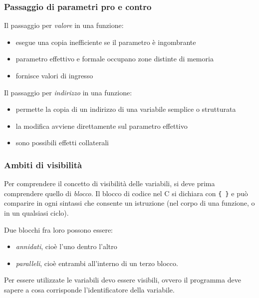 \documentclass[
]{article}
\begin{document}
\hypertarget{header-n855}{%
\subsubsection{Passaggio di parametri pro e contro}\label{header-n855}}

Il passaggio per \emph{valore} in una funzione:

\begin{itemize}
\item
  esegue una copia inefficiente se il parametro è ingombrante
\item
  parametro effettivo e formale occupano zone distinte di memoria
\item
  fornisce valori di ingresso
\end{itemize}

Il passaggio per \emph{indirizzo} in una funzione:

\begin{itemize}
\item
  permette la copia di un indirizzo di una variabile semplice o
  strutturata
\item
  la modifica avviene direttamente sul parametro effettivo
\item
  sono possibili effetti collaterali
\end{itemize}

\hypertarget{header-n873}{%
\subsubsection{Ambiti di visibilità}\label{header-n873}}

Per comprendere il concetto di visibilità delle variabili, si deve prima
comprendere quello di \emph{blocco}. Il blocco di codice nel C si
dichiara con \texttt{\{\ \}} e può comparire in ogni sintassi che
consente un istruzione (nel corpo di una funzione, o in un qualsiasi
ciclo).

Due blocchi fra loro possono essere:

\begin{itemize}
\item
  \emph{annidati}, cioè l'uno dentro l'altro
\item
  \emph{paralleli}, cioè entrambi all'interno di un terzo blocco.
\end{itemize}

Per essere utilizzate le variabili devo essere visibili, ovvero il
programma deve sapere a cosa corrisponde l'identificatore della
variabile.
\end{document}

